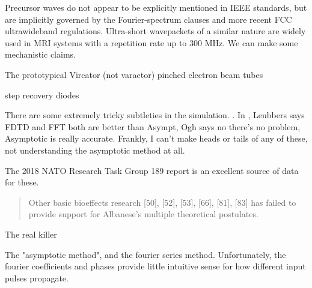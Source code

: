 \documentclass[paper.tex]{subfiles}
\begin{document}
Precursor waves do not appear to be explicitly mentioned in IEEE standards, but are implicitly governed by the Fourier-spectrum clauses and more recent FCC ultrawideband regulations. Ultra-short wavepackets of a similar nature are widely used in MRI systems with a repetition rate up to 300 MHz. We can make some mechanistic claims.



The prototypical Vircator (not varactor) pinched electron beam tubes 

step recovery diodes

\begin{sidenote}
There are some extremely tricky subtleties in the simulation.  \cite{propagation1992}. In \cite{Comments1993}, Leubbers says FDTD and FFT both are better than Asympt, Ogh says no there's no problem, Asymptotic is really accurate. Frankly, I can't make heads or tails of any of these, not understanding the asymptotic method at all.
\end{sidenote}


The 2018 NATO Research Task Group 189 report \cite{treatyelectromagnetic} is an excellent source of data for these. 

\begin{quote}
	Other basic bioeffects research [50], [52], [53], [66], [81], [83] has failed to provide support for Albanese’s multiple	theoretical postulates.
\end{quote}

The real killer 







\footnotemark
{}



The "asymptotic method", and the fourier series method. Unfortunately, the fourier coefficients and phases provide little intuitive sense for how different input pulses propagate. 

\end{document}
